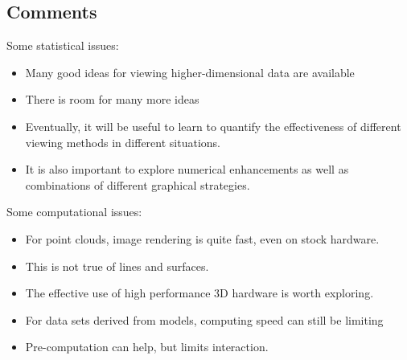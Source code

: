 \begin{slide}{}
\section{Comments}
Some statistical issues:
\begin{itemize}
\item
Many good ideas for viewing higher-dimensional data are available
\item
There is room for many more ideas
\item
Eventually, it will be useful to learn to quantify the effectiveness
of different viewing methods in different situations.
\item
It is also important to explore numerical enhancements as well as
combinations of different graphical strategies.
\end{itemize}
\end{slide}

\begin{slide}{}
Some computational issues:
\begin{itemize}
\item
For point clouds, image rendering is quite fast, even on stock
hardware.
\item
This is not true of lines and surfaces.
\item
The effective use of high performance 3D hardware is worth exploring.
\item
For data sets derived from models, computing speed can still be limiting
\item
Pre-computation can help, but limits interaction.
\end{itemize}
\end{slide}
